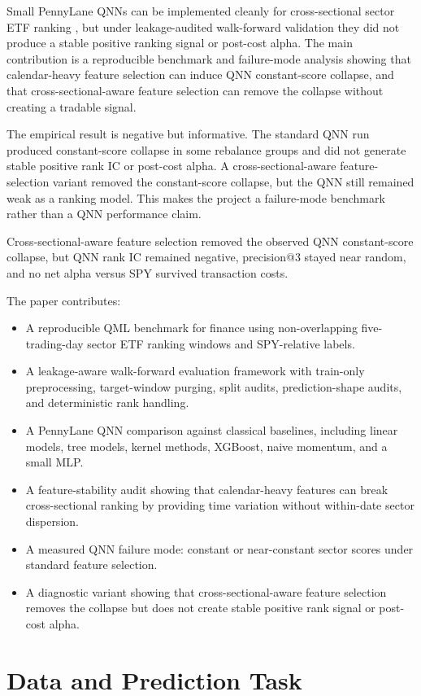 \documentclass[11pt]{article}
\makeatletter
\newcommand{\keyresult}{Cross-sectional-aware feature selection removed the observed QNN constant-score collapse, but QNN rank IC remained negative, precision@3 stayed near random, and no net alpha versus SPY survived transaction costs.}
\makeatother
\begin{document}
Small PennyLane QNNs can be implemented cleanly for cross-sectional sector ETF ranking \cite{bergholm2018pennylane}, but under leakage-audited walk-forward validation they did not produce a stable positive ranking signal or post-cost alpha. The main contribution is a reproducible benchmark and failure-mode analysis showing that calendar-heavy feature selection can induce QNN constant-score collapse, and that cross-sectional-aware feature selection can remove the collapse without creating a tradable signal.

The empirical result is negative but informative. The standard QNN run produced constant-score collapse in some rebalance groups and did not generate stable positive rank IC or post-cost alpha. A cross-sectional-aware feature-selection variant removed the constant-score collapse, but the QNN still remained weak as a ranking model. This makes the project a failure-mode benchmark rather than a QNN performance claim.

\keyresult{}

The paper contributes:
\begin{itemize}
  \item A reproducible QML benchmark for finance using non-overlapping five-trading-day sector ETF ranking windows and SPY-relative labels.
  \item A leakage-aware walk-forward evaluation framework with train-only preprocessing, target-window purging, split audits, prediction-shape audits, and deterministic rank handling.
  \item A PennyLane QNN comparison against classical baselines, including linear models, tree models, kernel methods, XGBoost, naive momentum, and a small MLP.
  \item A feature-stability audit showing that calendar-heavy features can break cross-sectional ranking by providing time variation without within-date sector dispersion.
  \item A measured QNN failure mode: constant or near-constant sector scores under standard feature selection.
  \item A diagnostic variant showing that cross-sectional-aware feature selection removes the collapse but does not create stable positive rank signal or post-cost alpha.
\end{itemize}

\section{Data and Prediction Task}
\end{document}
